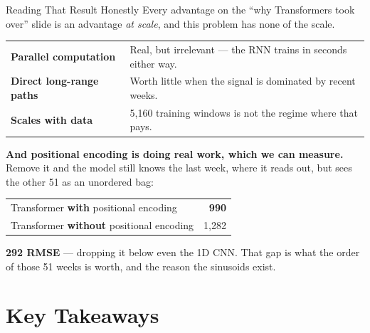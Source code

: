 \documentclass[aspectratio=169, 11pt]{beamer}
\begin{document}
\begin{frame}{Reading That Result Honestly}
  Every advantage on the ``why Transformers took over'' slide is an advantage \emph{at scale}, and
  this problem has none of the scale.

  \vspace{0.1cm}
  \begin{center}
    {\small
    \begin{tabular}{p{4.3cm}p{8.2cm}}
      \toprule
      \textbf{Parallel computation} & Real, but irrelevant --- the RNN trains in seconds either way. \\[3pt]
      \textbf{Direct long-range paths} & Worth little when the signal is dominated by recent weeks. \\[3pt]
      \textbf{Scales with data} & 5{,}160 training windows is not the regime where that pays. \\
      \bottomrule
    \end{tabular}
    }
  \end{center}

  \vspace{-0.05cm}
  \textbf{And positional encoding is doing real work, which we can measure.} Remove it and the
  model still knows the last week, where it reads out, but sees the other 51 as an unordered
  bag:
  \begin{center}
    {\small
    \begin{tabular}{lr}
      \toprule
      Transformer \textbf{with} positional encoding & \textbf{990} \\
      Transformer \textbf{without} positional encoding & 1{,}282 \\
      \bottomrule
    \end{tabular}
    }
  \end{center}

  \vspace{-0.05cm}
  \textbf{292 RMSE} --- dropping it below even the 1D CNN. That gap is what the order of those 51
  weeks is worth, and the reason the sinusoids exist.
\end{frame}

\section{Key Takeaways}
\end{document}
